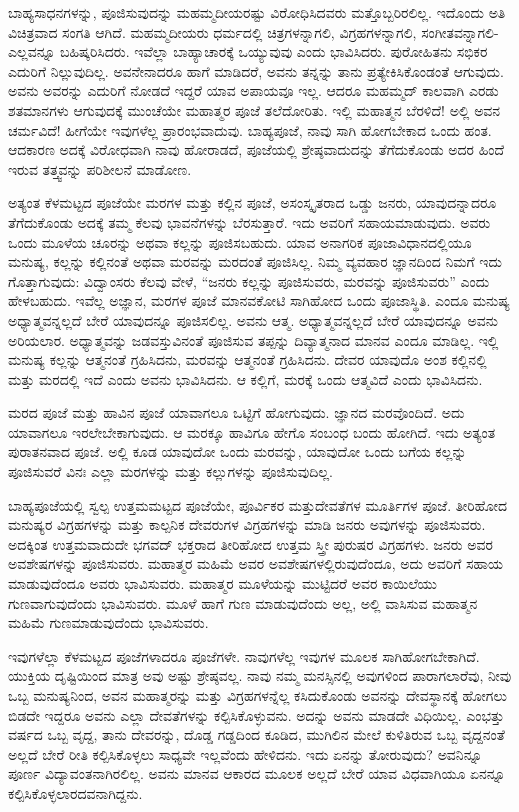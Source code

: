 ಬಾಹ್ಯಸಾಧನಗಳನ್ನು, ಪೂಜಿಸುವುದನ್ನು ಮಹಮ್ಮದೀಯರಷ್ಟು ವಿರೋಧಿಸಿದವರು ಮತ್ತೊಬ್ಬರಿರಲಿಲ್ಲ. ಇದೊಂದು ಅತಿ ವಿಚಿತ್ರವಾದ ಸಂಗತಿ ಆಗಿದೆ. ಮಹಮ್ಮದೀಯರು ಧರ್ಮದಲ್ಲಿ ಚಿತ್ರಗಳನ್ನಾಗಲಿ, ವಿಗ್ರಹಗಳನ್ನಾಗಲಿ, ಸಂಗೀತವನ್ನಾಗಲಿ-\break ಎಲ್ಲವನ್ನೂ ಬಹಿಷ್ಕರಿಸಿದರು. ಇವೆಲ್ಲಾ ಬಾಹ್ಯಾಚಾರಕ್ಕೆ ಒಯ್ಯುವುವು ಎಂದು ಭಾವಿಸಿದರು. ಪುರೋಹಿತನು ಸಭಿಕರ ಎದುರಿಗೆ ನಿಲ್ಲುವುದಿಲ್ಲ. ಅವನೇನಾದರೂ ಹಾಗೆ ಮಾಡಿದರೆ, ಅವನು ತನ್ನನ್ನು ತಾನು ಪ್ರತ್ಯೇಕಿಸಿಕೊಂಡಂತೆ ಆಗುವುದು. ಅವನು ಅವರನ್ನು ಎದುರಿಗೆ ನೋಡದೆ ಇದ್ದರೆ ಯಾವ ಅಪಾಯವೂ ಇಲ್ಲ. ಆದರೂ ಮಹಮ್ಮದ್ ಕಾಲವಾಗಿ ಎರಡು ಶತಮಾನಗಳು ಆಗುವುದಕ್ಕೆ ಮುಂಚೆಯೇ ಮಹಾತ್ಮರ ಪೂಜೆ ತಲೆದೋರಿತು. ಇಲ್ಲಿ ಮಹಾತ್ಮನ ಬೆರಳಿದೆ! ಅಲ್ಲಿ ಅವನ ಚರ್ಮವಿದೆ! ಹೀಗೆಯೇ ಇವುಗಳೆಲ್ಲ ಪ್ರಾರಂಭವಾದುವು. ಬಾಹ್ಯಪೂಜೆ, ನಾವು ಸಾಗಿ ಹೋಗಬೇಕಾದ ಒಂದು ಹಂತ. ಆದಕಾರಣ ಅದಕ್ಕೆ ವಿರೋಧವಾಗಿ ನಾವು ಹೋರಾಡದೆ, ಪೂಜೆಯಲ್ಲಿ ಶ್ರೇಷ್ಠವಾದುದನ್ನು ತೆಗೆದುಕೊಂಡು ಅದರ ಹಿಂದೆ ಇರುವ ತತ್ತ್ವವನ್ನು ಪರಿಶೀಲನೆ ಮಾಡೋಣ.

ಅತ್ಯಂತ ಕೆಳಮಟ್ಟದ ಪೂಜೆಯೇ ಮರಗಳ ಮತ್ತು ಕಲ್ಲಿನ ಪೂಜೆ, ಅಸಂಸ್ಕೃತರಾದ ಒಡ್ಡು ಜನರು, ಯಾವುದನ್ನಾದರೂ ತೆಗೆದುಕೊಂಡು ಅದಕ್ಕೆ ತಮ್ಮ ಕೆಲವು ಭಾವನೆಗಳನ್ನು ಬೆರಸುತ್ತಾರೆ. ಇದು ಅವರಿಗೆ ಸಹಾಯಮಾಡುವುದು. ಅವರು ಒಂದು ಮೂಳೆಯ ಚೂರನ್ನು ಅಥವಾ ಕಲ್ಲನ್ನು ಪೂಜಿಸಬಹುದು. ಯಾವ ಅನಾಗರಿಕ ಪೂಜಾವಿಧಾನದಲ್ಲಿಯೂ ಮನುಷ್ಯ, ಕಲ್ಲನ್ನು ಕಲ್ಲಿನಂತೆ ಅಥವಾ ಮರವನ್ನು ಮರದಂತೆ ಪೂಜಿಸಿಲ್ಲ. ನಿಮ್ಮ ವ್ಯವಹಾರ ಜ್ಞಾನದಿಂದ ನಿಮಗೆ ಇದು ಗೊತ್ತಾಗುವುದು: ವಿದ್ವಾಂಸರು ಕೆಲವು ವೇಳೆ, “ಜನರು ಕಲ್ಲನ್ನು ಪೂಜಿಸುವರು, ಮರವನ್ನು ಪೂಜಿಸುವರು” ಎಂದು ಹೇಳಬಹುದು. ಇವೆಲ್ಲ ಅಜ್ಞಾನ, ಮರಗಳ ಪೂಜೆ ಮಾನವಕೋಟಿ ಸಾಗಿಹೋದ ಒಂದು ಪೂಜಾಸ್ಥಿತಿ. ಎಂದೂ ಮನುಷ್ಯ ಅಧ್ಯಾತ್ಮವನ್ನಲ್ಲದೆ ಬೇರೆ ಯಾವುದನ್ನೂ ಪೂಜಿಸಲಿಲ್ಲ. ಅವನು ಆತ್ಮ. ಅಧ್ಯಾತ್ಮವನ್ನಲ್ಲದೆ ಬೇರೆ ಯಾವುದನ್ನೂ ಅವನು ಅರಿಯಲಾರ. ಅಧ್ಯಾತ್ಮವನ್ನು ಜಡವಸ್ತುವಿನಂತೆ ಪೂಜಿಸುವ ತಪ್ಪನ್ನು ದಿವ್ಯಾತ್ಮನಾದ ಮಾನವ ಎಂದೂ ಮಾಡಿಲ್ಲ. ಇಲ್ಲಿ ಮನುಷ್ಯ ಕಲ್ಲನ್ನು ಆತ್ಮನಂತೆ ಗ್ರಹಿಸಿದನು, ಮರವನ್ನು ಆತ್ಮನಂತೆ ಗ್ರಹಿಸಿದನು. ದೇವರ ಯಾವುದೊ ಅಂಶ ಕಲ್ಲಿನಲ್ಲಿ ಮತ್ತು ಮರದಲ್ಲಿ ಇದೆ ಎಂದು ಅವನು ಭಾವಿಸಿದನು. ಆ ಕಲ್ಲಿಗೆ, ಮರಕ್ಕೆ ಒಂದು ಆತ್ಮವಿದೆ ಎಂದು ಭಾವಿಸಿದನು.

ಮರದ ಪೂಜೆ ಮತ್ತು ಹಾವಿನ ಪೂಜೆ ಯಾವಾಗಲೂ ಒಟ್ಟಿಗೆ ಹೋಗುವುದು. ಜ್ಞಾನದ ಮರವೊಂದಿದೆ. ಅದು ಯಾವಾಗಲೂ ಇರಲೇಬೇಕಾಗುವುದು. ಆ ಮರಕ್ಕೂ ಹಾವಿಗೂ ಹೇಗೊ ಸಂಬಂಧ ಬಂದು ಹೋಗಿದೆ. ಇದು ಅತ್ಯಂತ ಪುರಾತನವಾದ ಪೂಜೆ. ಅಲ್ಲಿ ಕೂಡ ಯಾವುದೋ ಒಂದು ಮರವನ್ನು, ಯಾವುದೋ ಒಂದು ಬಗೆಯ ಕಲ್ಲನ್ನು ಪೂಜಿಸುವರೆ ವಿನಃ ಎಲ್ಲಾ ಮರಗಳನ್ನು ಮತ್ತು ಕಲ್ಲುಗಳನ್ನು ಪೂಜಿಸುವುದಿಲ್ಲ.

ಬಾಹ್ಯಪೂಜೆಯಲ್ಲಿ ಸ್ವಲ್ಪ ಉತ್ತಮಮಟ್ಟದ ಪೂಜೆಯೇ, ಪೂರ್ವಿಕರ ಮತ್ತು\break ದೇವತೆಗಳ ಮೂರ್ತಿಗಳ ಪೂಜೆ. ತೀರಿಹೋದ ಮನುಷ್ಯರ ವಿಗ್ರಹಗಳನ್ನು ಮತ್ತು ಕಾಲ್ಪನಿಕ ದೇವರುಗಳ ವಿಗ್ರಹಗಳನ್ನು ಮಾಡಿ ಜನರು ಅವುಗಳನ್ನು ಪೂಜಿಸುವರು. ಅದಕ್ಕಿಂತ ಉತ್ತಮವಾದುದೇ ಭಗವದ್ ಭಕ್ತರಾದ ತೀರಿಹೋದ ಉತ್ತಮ ಸ್ತ್ರೀ ಪುರುಷರ ವಿಗ್ರಹಗಳು. ಜನರು ಅವರ ಅವಶೇಷಗಳನ್ನು ಪೂಜಿಸುವರು. ಮಹಾತ್ಮರ ಮಹಿಮೆ ಅವರ ಅವಶೇಷಗಳಲ್ಲಿರುವುದೆಂದೂ, ಅದು ಅವರಿಗೆ ಸಹಾಯ ಮಾಡುವುದೆಂದೂ ಅವರು ಭಾವಿಸುವರು. ಮಹಾತ್ಮರ ಮೂಳೆಯನ್ನು ಮುಟ್ಟಿದರೆ ಅವರ ಕಾಯಿಲೆಯು ಗುಣವಾಗುವುದೆಂದು ಭಾವಿಸುವರು. ಮೂಳೆ ಹಾಗೆ ಗುಣ ಮಾಡುವುದೆಂದು ಅಲ್ಲ, ಅಲ್ಲಿ ವಾಸಿಸುವ ಮಹಾತ್ಮನ ಮಹಿಮೆ ಗುಣಮಾಡುವುದೆಂದು ಭಾವಿಸುವರು.

ಇವುಗಳೆಲ್ಲಾ ಕೆಳಮಟ್ಟದ ಪೂಜೆಗಳಾದರೂ ಪೂಜೆಗಳೇ. ನಾವುಗಳೆಲ್ಲ ಇವುಗಳ ಮೂಲಕ ಸಾಗಿಹೋಗಬೇಕಾಗಿದೆ. ಯುಕ್ತಿಯ ದೃಷ್ಟಿಯಿಂದ ಮಾತ್ರ ಅವು ಅಷ್ಟು ಶ್ರೇಷ್ಠವಲ್ಲ. ನಾವು ನಮ್ಮ ಮನಸ್ಸಿನಲ್ಲಿ ಅವುಗಳಿಂದ ಪಾರಾಗಲಾರೆವು, ನೀವು ಒಬ್ಬ ಮನುಷ್ಯನಿಂದ, ಅವನ ಮಹಾತ್ಮರನ್ನು ಮತ್ತು ವಿಗ್ರಹಗಳನ್ನೆಲ್ಲ ಕಸಿದುಕೊಂಡು ಅವನನ್ನು ದೇವಸ್ಥಾನಕ್ಕೆ ಹೋಗಲು ಬಿಡದೇ ಇದ್ದರೂ ಅವನು ಎಲ್ಲಾ ದೇವತೆಗಳನ್ನು ಕಲ್ಪಿಸಿಕೊಳ್ಳುವನು. ಅದನ್ನು ಅವನು ಮಾಡದೇ ವಿಧಿಯಿಲ್ಲ. ಎಂಭತ್ತು ವರ್ಷದ ಒಬ್ಬ ವೃದ್ದ, ತಾನು ದೇವರನ್ನು, ದೊಡ್ಡ ಗಡ್ಡದಿಂದ ಕೂಡಿದ, ಮುಗಿಲಿನ ಮೇಲೆ ಕುಳಿತಿರುವ ಒಬ್ಬ ವೃದ್ದನಂತೆ ಅಲ್ಲದೆ ಬೇರೆ ರೀತಿ ಕಲ್ಪಿಸಿಕೊಳ್ಳಲು ಸಾಧ್ಯವೇ ಇಲ್ಲವೆಂದು ಹೇಳಿದನು. ಇದು ಏನನ್ನು ತೋರುವುದು? ಅವನಿನ್ನೂ ಪೂರ್ಣ ವಿದ್ಯಾವಂತನಾಗಿರಲಿಲ್ಲ. ಅವನು ಮಾನವ ಆಕಾರದ ಮೂಲಕ ಅಲ್ಲದೆ ಬೇರೆ ಯಾವ ವಿಧವಾಗಿಯೂ ಏನನ್ನೂ ಕಲ್ಪಿಸಿಕೊಳ್ಳಲಾರದವನಾಗಿದ್ದನು.

